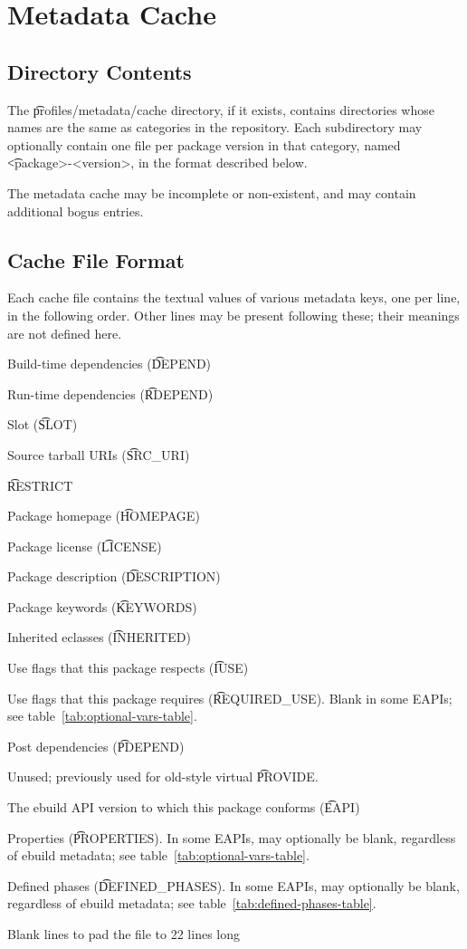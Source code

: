 \chapter{Metadata Cache}
\label{metadata-cache}

\section{Directory Contents}

The \t{profiles/metadata/cache} directory, if it exists, contains directories whose names are the
same as categories in the repository. Each subdirectory may optionally contain one file per package
version in that category, named \t{<package>-<version>}, in the format described below.

The metadata cache may be incomplete or non-existent, and may contain additional bogus entries.

\section{Cache File Format}

Each cache file contains the textual values of various metadata keys, one per line, in the following
order. Other lines may be present following these; their meanings are not defined here.

\begin{compactenum}
\item Build-time dependencies (\t{DEPEND})
\item Run-time dependencies (\t{RDEPEND})
\item Slot (\t{SLOT})
\item Source tarball URIs (\t{SRC_URI})
\item \t{RESTRICT}
\item Package homepage (\t{HOMEPAGE})
\item Package license (\t{LICENSE})
\item Package description (\t{DESCRIPTION})
\item Package keywords (\t{KEYWORDS})
\item Inherited eclasses (\t{INHERITED})
\item Use flags that this package respects (\t{IUSE})
\item Use flags that this package requires (\t{REQUIRED_USE}).
    Blank in some EAPIs; see table~\ref{tab:optional-vars-table}.
\item Post dependencies (\t{PDEPEND})
\item Unused; previously used for old-style virtual \t{PROVIDE}.
\item The ebuild API version to which this package conforms (\t{EAPI})
\item Properties (\t{PROPERTIES}). In some EAPIs, may optionally be blank, regardless of ebuild
    metadata; see table~\ref{tab:optional-vars-table}.
\item Defined phases (\t{DEFINED_PHASES}). In some EAPIs, may optionally be blank, regardless of
    ebuild metadata; see table~\ref{tab:defined-phases-table}.
\item Blank lines to pad the file to 22 lines long
\end{compactenum}

